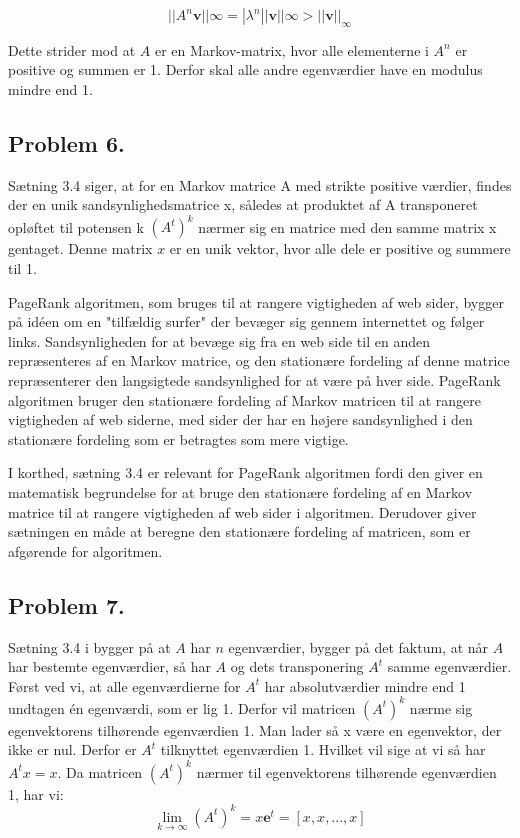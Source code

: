 $$||A^n\mathbf{v}||\infty = |\lambda^n||\mathbf{v}||\infty > ||\mathbf{v}||_\infty$$

Dette strider mod at $A$ er en Markov-matrix, hvor alle elementerne i $A^n$ er positive og summen er 1. Derfor skal alle andre egenværdier have en modulus mindre end 1.


\subsection*{Problem 6.}

Sætning 3.4 siger, at for en Markov matrice A med strikte positive værdier, findes der en unik sandsynlighedsmatrice x, således at produktet af A transponeret opløftet til potensen k $(A^t)^k$ nærmer sig en matrice med den samme matrix x gentaget. Denne matrix $x$ er en unik vektor, hvor alle dele er positive og summere til 1.

PageRank algoritmen, som bruges til at rangere vigtigheden af web sider, bygger på idéen om en "tilfældig surfer" der bevæger sig gennem internettet og følger links. Sandsynligheden for at bevæge sig fra en web side til en anden repræsenteres af en Markov matrice, og den stationære fordeling af denne matrice repræsenterer den langsigtede sandsynlighed for at være på hver side. PageRank algoritmen bruger den stationære fordeling af Markov matricen til at rangere vigtigheden af web siderne, med sider der har en højere sandsynlighed i den stationære fordeling som er betragtes som mere vigtige.

I korthed, sætning 3.4 er relevant for PageRank algoritmen fordi den giver en matematisk begrundelse for at bruge den stationære fordeling af en Markov matrice til at rangere vigtigheden af web sider i algoritmen. Derudover giver sætningen en måde at beregne den stationære fordeling af matricen, som er afgørende for algoritmen.

\subsection*{Problem 7.}

Sætning 3.4 i bygger på at $A$ har $n$ egenværdier, bygger på det faktum, at når $A$ har bestemte egenværdier, så har $A$ og dets transponering $A^t$ samme egenværdier. Først ved vi, at alle egenværdierne for $A^t$ har absolutværdier mindre end 1 undtagen én egenværdi, som er lig 1. Derfor vil matricen $(A^t)^k$ nærme sig egenvektorens tilhørende egenværdien 1. Man lader så x være en egenvektor, der ikke er nul. Derfor er $A^t$ tilknyttet egenværdien 1. Hvilket vil sige at vi så har $A^t x = x$. Da matricen $(A^t)^k$ nærmer til egenvektorens tilhørende egenværdien 1, har vi:
$$\lim_{k \to \infty} (A^t)^k = x\mathbf{e}^t = [x, x, . . ., x]$$








